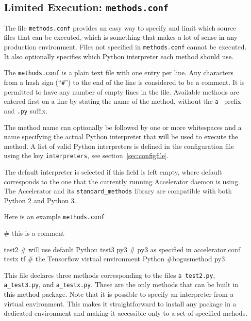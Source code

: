 \subsection{Limited Execution:  \texttt{methods.conf}}
\label{sec:methods_conf}
The file \texttt{methods.conf} provides an easy way to specify and
limit which source files that can be executed, which is something that
makes a lot of sense in any production environment.  Files not
specified in \texttt{methods.conf} cannot be executed.  It also
optionally specifies which Python interpreter each method should use.

The \texttt{methods.conf} is a plain text file with one entry per
line.  Any characters from a hash sign (``\texttt{\#}'') to the end of
the line is considered to be a comment.  It is permitted to have any
number of empty lines in the file.  Available methods are entered
first on a line by stating the name of the method, without the
\texttt{a\_} prefix and \texttt{.py} suffix.

The method name can optionally be followed by one or more whitespaces
and a name specifying the actual Python interpreter that will be used
to execute the method.  A list of valid Python interpreters is defined
in the configuration file using the key
\texttt{interpreters}, see section~\ref{sec:configfile}.

The default interpreter is selected if this field is left empty, where
default corresponds to the one that the currently running Accelerator
daemon is using.  The Accelerator and its \texttt{standard\_methods}
library are compatible with both Python 2 and Python 3.

Here is an example \texttt{methods.conf}
\begin{shell}
# this is a comment

test2                # will use default Python
test3           py3  # py3 as specified in accelerator.conf
testx           tf   # the Tensorflow virtual environment Python
#bogusmethod    py3
\end{shell}
This file declares three methods corresponding to the files
\texttt{a\_test2.py}, \texttt{a\_test3.py}, and \texttt{a\_testx.py}.
These are the only methods that can be built in this method package.
Note that it is possible to specify an interpreter from a virtual
environment.  This makes it straightforward to install any package in
a dedicated environment and making it accessible only to a set of
specified mehods.



